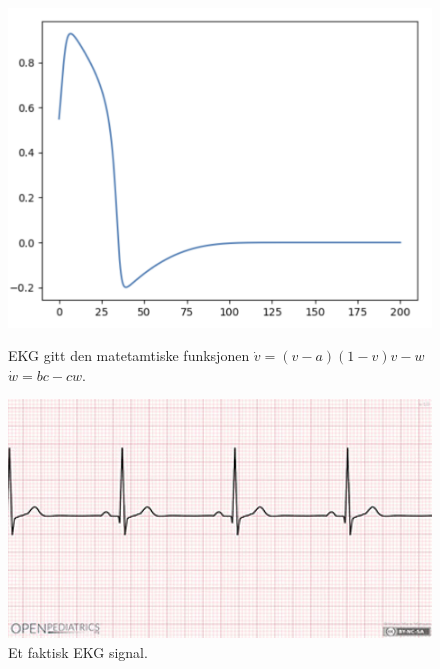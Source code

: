 \begin{figure}[!h]
    \centering
    \begin{minipage}[c]{0.4\textwidth}
        \centering
        \includegraphics[width=1.1\textwidth]{./Bilder/Enkel_EKG_v0.png} 
        \caption{EKG gitt den matetamtiske funksjonen \newline $\dot{v} = (v-a)(1-v)v-w$ \newline $\dot{w} = bc - cw$.}
        \label{fig:ekg_simple_1}
    \end{minipage}
    \hfill
    \begin{minipage}[c]{0.5\textwidth}
        \centering
        \includegraphics[width=1.1\textwidth]{./Bilder/ECG1920x1080.jpg} 
        \caption{Et faktisk EKG signal.}
        \label{fig:ekg_real_1}
    \end{minipage}
\end{figure}

